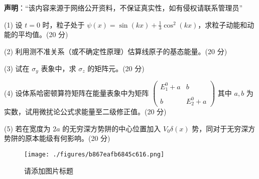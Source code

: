 
\textbf{声明}：“该内容来源于网络公开资料，不保证真实性，如有侵权请联系管理员”



(1) 设 $t=0$ 时，粒子处于 $\psi(x) = \sin(kx) + \frac{1}{3}\cos^2(kx)$，求粒子动能和动能的平均值。(20 分)

(2) 利用测不准关系（或不确定性原理）估算线原子的基态能量。(20 分)

(3) 试在 $\sigma_y$ 表象中，求 $\sigma_z$ 的矩阵元。(20 分)

(4) 设体系哈密顿算符矩阵在能量表象中为矩阵
$\begin{pmatrix}E_1^0 + a & b \\\\b & E_2^0 + a\end{pmatrix}$
其中 $a, b$ 为实数，试用微扰论公式求能量至二级修正值。(20 分)

(5) 若在宽度为 $2a$ 的无穷深方势阱的中心位置加入 $V_0 \delta(x)$ 势，同对于无穷深方势阱的原本能级有何影响。(20 分)

\begin{figure}[ht]
\centering
\texttt{[image: ./figures/b867eafb6845c616.png]}
\caption{请添加图片标题} \label{fig_FDU99_3}
\end{figure}


